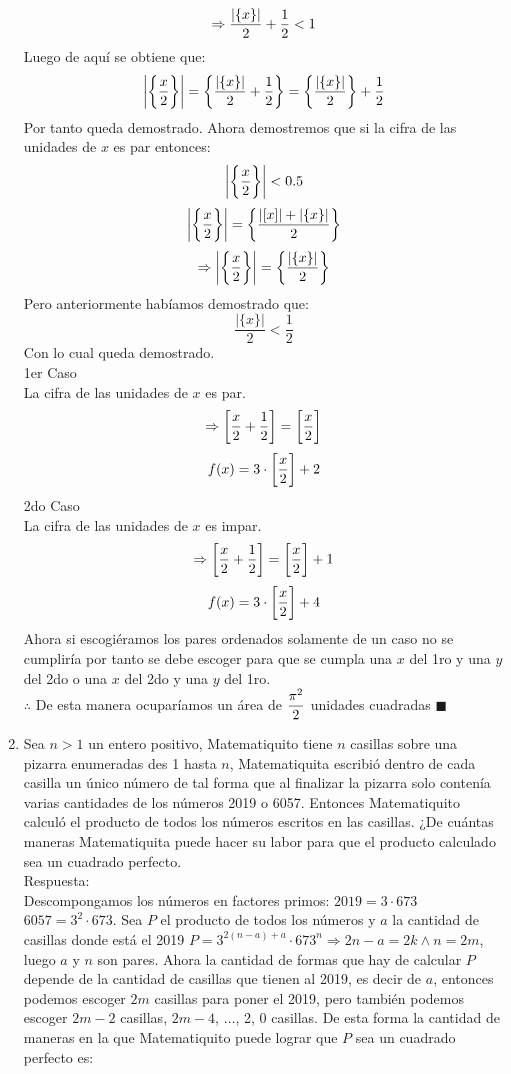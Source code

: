 \documentclass{book}
\begin{document}
\begin{enumerate}
        $$\Rightarrow {|\{x\}|\over 2}+{1\over 2}<1$$
        Luego de aquí se obtiene que:
        $$\bigg|\bigg\{{x\over 2}\bigg\}\bigg|=\bigg\{\frac{|\{x\}|}{2}+{1\over 2}\bigg\}=\bigg\{\frac{|\{x\}|}{2}\bigg\}+{1\over 2}$$
        Por tanto queda demostrado. Ahora demostremos que si la cifra de las unidades de $x$ es par entonces:
        $$\bigg|\bigg\{{x\over 2}\bigg\}\bigg|<0.5$$
        $$\bigg|\bigg\{{x\over 2}\bigg\}\bigg|=\bigg\{\frac{|[x]|+|\{x\}|}{2}\bigg\}$$
        $$\Rightarrow \bigg|\bigg\{{x\over 2}\bigg\}\bigg|=\bigg\{{|\{x\}|\over 2}\bigg\}$$
        Pero anteriormente habíamos demostrado que:
        $$\frac{|\{x\}|}{2}<\frac{1}{2}$$
        Con lo cual queda demostrado.\\
        1er Caso \\
        La cifra de las unidades de $x$ es par.
        $$\Rightarrow\bigg[{x\over 2}+{1\over 2}\bigg]=\bigg[{x\over 2}\bigg]$$
        $$f(x)=3\cdot\bigg[{x\over 2}\bigg]+2$$
        2do Caso\\
        La cifra de las unidades de $x$ es impar.
        $$\Rightarrow\bigg[{x\over 2}+{1\over 2}\bigg]=\bigg[{x\over 2}\bigg]+1$$
        $$f(x)=3\cdot\bigg[{x\over 2}\bigg]+4$$
        Ahora si escogiéramos los pares ordenados solamente de un caso no se cumpliría por tanto se debe escoger para que se cumpla una $x$ del 1ro y una $y$ del 2do o una $x$ del 2do y una $y$ del 1ro. \\
        $\therefore$ De esta manera ocuparíamos un área de $\displaystyle{\pi^2\over 2}$ unidades cuadradas $\blacksquare$\\
        \item Sea $n>1$ un entero positivo, Matematiquito tiene $n$ casillas sobre una pizarra enumeradas des 1 hasta $n$, Matematiquita escribió dentro de cada casilla un único número de tal forma que al finalizar la pizarra solo contenía varias cantidades de los números 2019 o 6057. Entonces Matematiquito calculó el producto de todos los números escritos en las casillas. ¿De cuántas maneras Matematiquita puede hacer su labor para que el producto calculado sea un cuadrado perfecto.\\
        Respuesta:\\
        Descompongamos los números en factores primos: $2019=3\cdot 673$ $6057=3^2\cdot 673$. Sea $P$ el producto de todos los números y $a$ la cantidad de casillas donde está el 2019 $P=3^{2(n-a)+a}\cdot  673^{n}\Rightarrow 2n-a=2k \wedge n=2m$, luego $a$ y $n$ son pares. Ahora la cantidad de formas que hay de calcular $P$ depende de la cantidad de casillas que tienen al 2019, es decir de $a$, entonces podemos escoger $2m$ casillas para poner el 2019, pero también podemos escoger $2m-2$ casillas, $2m-4$, $\ldots$, 2, 0 casillas. De esta forma la cantidad de maneras en la que Matematiquito puede lograr que $P$ sea un cuadrado perfecto es:

\end{enumerate}
\end{document}
